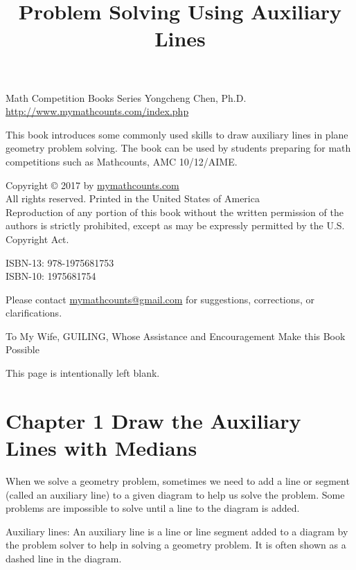 \documentclass[10pt]{article}
\title{Problem Solving Using Auxiliary Lines }
\author{}
\date{}
\begin{document}
\maketitle
Math Competition Books Series
Yongcheng Chen, Ph.D.\\
\href{http://www.mymathcounts.com/index.php}{http://www.mymathcounts.com/index.php}

This book introduces some commonly used skills to draw auxiliary lines in plane geometry problem solving. The book can be used by students preparing for math competitions such as Mathcounts, AMC 10/12/AIME.

Copyright © 2017 by \href{http://mymathcounts.com}{mymathcounts.com}\\
All rights reserved. Printed in the United States of America\\
Reproduction of any portion of this book without the written permission of the authors is strictly prohibited, except as may be expressly permitted by the U.S. Copyright Act.

ISBN-13: 978-1975681753\\
ISBN-10: 1975681754

Please contact \href{mailto:mymathcounts@gmail.com}{mymathcounts@gmail.com} for suggestions, corrections, or clarifications.

To My Wife, GUILING, Whose Assistance and Encouragement Make this Book Possible


This page is intentionally left blank.

\section*{Chapter 1 Draw the Auxiliary Lines with Medians}  
When we solve a geometry problem, sometimes we need to add a line or segment (called an auxiliary line) to a given diagram to help us solve the problem. Some problems are impossible to solve until a line to the diagram is added.

Auxiliary lines: An auxiliary line is a line or line segment added to a diagram by the problem solver to help in solving a geometry problem. It is often shown as a dashed line in the diagram.
\end{document}
